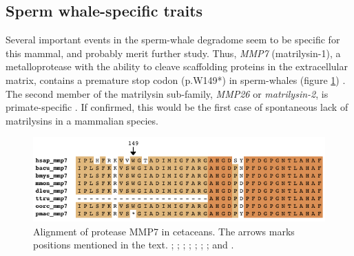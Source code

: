 
\subsection{Sperm whale-specific traits} \label{ss_sperm_whale_results_specific}

Several important events in the sperm-whale degradome seem to be specific for this mammal, and probably merit further study.
Thus, \textit{MMP7} (matrilysin-1), a metalloprotease with the ability to cleave scaffolding proteins in the extracellular matrix, contains a premature stop codon ({p.W149*}) in sperm-whales (figure \ref{f_results_sperm_whale_alignments_mmp7}) \cite{Grindel2018}.
The second member of the matrilysin sub-family, \textit{MMP26} or \textit{matrilysin-2}, is primate-specific \cite{Uria2000}.
If confirmed, this would be the first case of spontaneous lack of matrilysins in a mammalian species.

\begin{figure}[b!]
    \begin{center}
        \includegraphics[width=\textwidth]{figures/alignment_mmp7.pdf}
        \caption[Alignment of protease MMP7 in cetaceans]{\footnotesize Alignment of protease MMP7 in cetaceans. The arrows marks positions mentioned in the text. \hsap; \bacu; \bmys; \mmon; \dleu; \ttru; \oorc; and \hsap.}
        \label{f_results_sperm_whale_alignments_mmp7}
    \end{center}
\end{figure}

